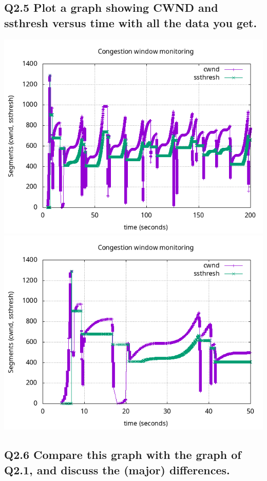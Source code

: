 \documentclass{article}
\begin{document}
\subsection{Q2.5 Plot a graph showing CWND and ssthresh versus time with all the data you get.}

\includegraphics[scale=0.5]{plots/lab1-group5-task2-question2.5.png}
\includegraphics[scale=0.5]{plots/lab1-group5-task2-question2.5-xrange-0-50.png}

\subsection{Q2.6 Compare this graph with the graph of Q2.1, and discuss the (major) differences.}
\end{document}
